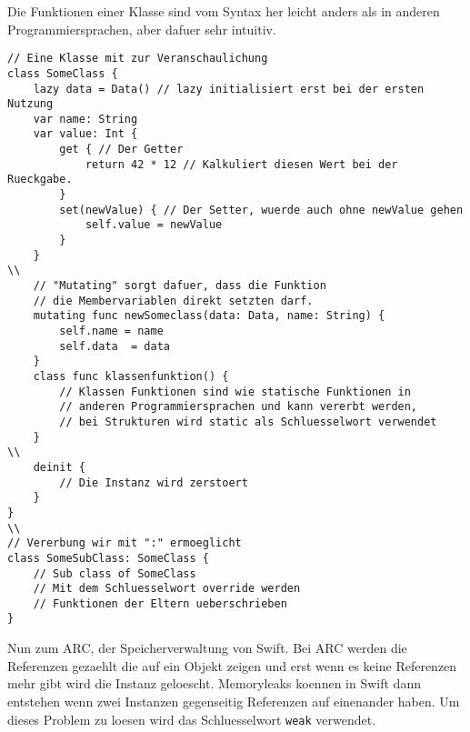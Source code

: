 Die Funktionen einer Klasse sind vom Syntax her leicht anders als in anderen Programmiersprachen, aber dafuer sehr intuitiv. 
\begin{lstlisting}
// Eine Klasse mit zur Veranschaulichung 
class SomeClass {
	lazy data = Data() // lazy initialisiert erst bei der ersten Nutzung
	var name: String
	var value: Int {
		get { // Der Getter
			return 42 * 12 // Kalkuliert diesen Wert bei der Rueckgabe.
		}
		set(newValue) { // Der Setter, wuerde auch ohne newValue gehen
			self.value = newValue
		}	
	} 
\\
	// "Mutating" sorgt dafuer, dass die Funktion 
	// die Membervariablen direkt setzten darf.
	mutating func newSomeclass(data: Data, name: String) {
		self.name = name
		self.data  = data
	}
	class func klassenfunktion() {
		// Klassen Funktionen sind wie statische Funktionen in 
		// anderen Programmiersprachen und kann vererbt werden, 
		// bei Strukturen wird static als Schluesselwort verwendet
	}
\\
	deinit {
		// Die Instanz wird zerstoert
	}
}
\\
// Vererbung wir mit ":" ermoeglicht
class SomeSubClass: SomeClass {
	// Sub class of SomeClass
	// Mit dem Schluesselwort override werden 
	// Funktionen der Eltern ueberschrieben
}
\end{lstlisting}
Nun zum ARC, der Speicherverwaltung von Swift. Bei ARC werden die Referenzen gezaehlt die auf ein Objekt zeigen und erst wenn es keine Referenzen mehr gibt wird die Instanz geloescht. Memoryleaks koennen in Swift dann entstehen wenn zwei Instanzen gegenseitig Referenzen auf einenander haben. Um dieses Problem zu loesen wird das Schluesselwort \lstinline{weak} verwendet.
